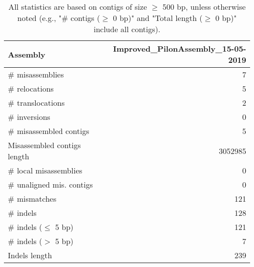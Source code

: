 \documentclass[12pt,a4paper]{article}
\begin{document}
\begin{table}[ht]
\begin{center}
\caption{All statistics are based on contigs of size $\geq$ 500 bp, unless otherwise noted (e.g., "\# contigs ($\geq$ 0 bp)" and "Total length ($\geq$ 0 bp)" include all contigs).}
\begin{tabular}{|l*{1}{|r}|}
\hline
Assembly & Improved\_PilonAssembly\_15-05-2019 \\ \hline
\# misassemblies & 7 \\ \hline
\hspace{5mm}\# relocations & 5 \\ \hline
\hspace{5mm}\# translocations & 2 \\ \hline
\hspace{5mm}\# inversions & 0 \\ \hline
\# misassembled contigs & 5 \\ \hline
Misassembled contigs length & 3052985 \\ \hline
\# local misassemblies & 0 \\ \hline
\# unaligned mis. contigs & 0 \\ \hline
\# mismatches & 121 \\ \hline
\# indels & 128 \\ \hline
\hspace{5mm}\# indels ($\leq$ 5 bp) & 121 \\ \hline
\hspace{5mm}\# indels ($>$ 5 bp) & 7 \\ \hline
Indels length & 239 \\ \hline
\end{tabular}
\end{center}
\end{table}
\end{document}
